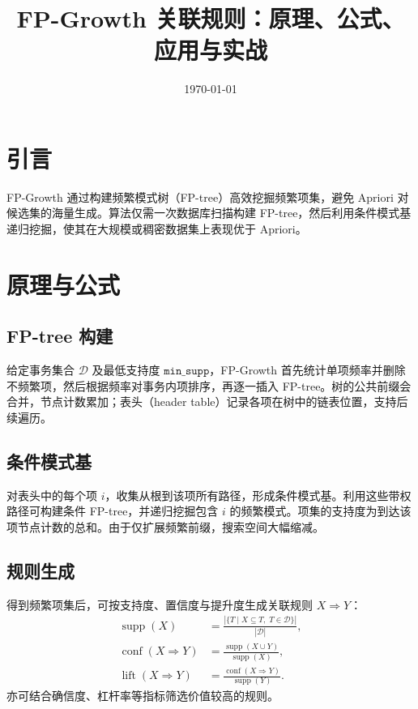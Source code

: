 \documentclass[UTF8,zihao=-4]{ctexart}
\title{FP-Growth 关联规则：原理、公式、应用与实战}
\author{}
\date{\today}
\begin{document}
\maketitle

\section{引言}
FP-Growth 通过构建频繁模式树（FP-tree）高效挖掘频繁项集，避免 Apriori 对候选集的海量生成。算法仅需一次数据库扫描构建 FP-tree，然后利用条件模式基递归挖掘，使其在大规模或稠密数据集上表现优于 Apriori。

\section{原理与公式}
\subsection{FP-tree 构建}
给定事务集合 \(\mathcal{D}\) 及最低支持度 \(\texttt{min\_supp}\)，FP-Growth 首先统计单项频率并删除不频繁项，然后根据频率对事务内项排序，再逐一插入 FP-tree。树的公共前缀会合并，节点计数累加；表头（header table）记录各项在树中的链表位置，支持后续遍历。

\subsection{条件模式基}
对表头中的每个项 \(i\)，收集从根到该项所有路径，形成条件模式基。利用这些带权路径可构建条件 FP-tree，并递归挖掘包含 \(i\) 的频繁模式。项集的支持度为到达该项节点计数的总和。由于仅扩展频繁前缀，搜索空间大幅缩减。

\subsection{规则生成}
得到频繁项集后，可按支持度、置信度与提升度生成关联规则 \(X \Rightarrow Y\)：
\begin{align}
\operatorname{supp}(X) &= \frac{\left|\{ T \mid X \subseteq T,\; T \in \mathcal{D}\}\right|}{|\mathcal{D}|},\\
\operatorname{conf}(X \Rightarrow Y) &= \frac{\operatorname{supp}(X \cup Y)}{\operatorname{supp}(X)},\\
\operatorname{lift}(X \Rightarrow Y) &= \frac{\operatorname{conf}(X \Rightarrow Y)}{\operatorname{supp}(Y)}.
\end{align}
亦可结合确信度、杠杆率等指标筛选价值较高的规则。
\end{document}
